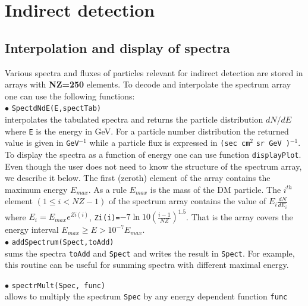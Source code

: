 \documentclass[12pt,a4paper]{article}
\begin{document}
  
\section{Indirect detection}

\subsection{Interpolation and display of spectra}
Various spectra and fluxes  of particles  relevant for indirect detection are stored in
arrays with {\bf NZ=250} elements. To decode and interpolate the spectrum array
one can use the following functions:\\

\noindent
$\bullet$  \verb|SpectdNdE(E,spectTab)|\\
interpolates the tabulated spectra  and returns the 
particle distribution $dN/dE$  where \verb|E| is the energy  in GeV. 
For a particle number  distribution the returned value is given in \verb|GeV|$^{-1}$
while  a particle flux is expressed in \verb|(sec cm|$^2$ \verb|sr GeV )|$^{-1}$.\\
To display the  spectra  as a function of energy one can use function {\tt displayPlot}.\\


Even though the user does not need to know the structure of the  spectrum array, we describe it below.
The first (zeroth) element of the array contains the maximum energy $E_{max}$. As a rule   $E_{max}$ is the mass of the DM particle.    
The $i^{th}$ element $(1\le i < NZ-1)$ of the spectrum array contains
the value of $E_i \frac{ dN}{dE_i} $ where  $E_i=E_{max} e^{Zi(i)}$,   
\verb|Zi(i)=|$ -7 \ln 10 \left(\frac{i-1}{NZ}\right)^{1.5}$.
 That is the array  covers the  energy interval  $E_{max} \ge E > 10^{-7}E_{max}$. \\

\noindent
$\bullet$ \verb|addSpectrum(Spect,toAdd)|\\
sums the  spectra \verb|toAdd|  and \verb|Spect| and writes the result in \verb|Spect|. For example, this routine can be useful for summing spectra 
with different  maximal energy.


\noindent
$\bullet$ \verb|spectrMult(Spec, func)|\\
allows to multiply the spectrum \verb|Spec| by any energy dependent function \verb|func|
\end{document}

